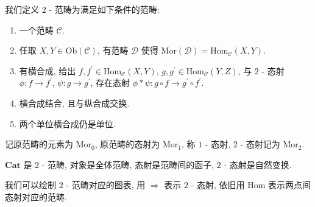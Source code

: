 \begin{definition}
    我们定义 \(2\) - 范畴为满足如下条件的范畴:

    \begin{enumerate}
        \item 一个范畴 \(\mathcal{C}\).
        \item 任取 \(X,Y \in \mathrm{Ob} (\mathcal{C})\), 有范畴 \(\mathcal{D}\) 使得 \(\mathrm{Mor} (\mathcal{D}) = \mathrm{Hom}_\mathcal{C} (X,Y)\).
        \item 有横合成, 给出 \(f, f^\prime \in \mathrm{Hom}_\mathcal{C} (X,Y)\), \(g, g^\prime \in \mathrm{Hom}_\mathcal{C} (Y,Z)\), 与
                \(2\) - 态射 \(\phi : f \to f^\prime\), \(\psi : g \to g^\prime\), 存在态射 \(\phi \ast \psi : g \circ f \to g^\prime \circ f^\prime\).
        \item 横合成结合, 且与纵合成交换.
        \item 两个单位横合成仍是单位.
    \end{enumerate}
\end{definition}

记原范畴的元素为 \(\mathrm{Mor}_0\), 原范畴的态射为 \(\mathrm{Mor}_1\), 称 \(1\) - 态射, \(2\) - 态射记为 \(\mathrm{Mor}_2\).

\begin{example}
    \(\mathbf{Cat}\) 是 \(2\) - 范畴, 对象是全体范畴, 态射是范畴间的函子, \(2\) - 态射是自然变换.
\end{example}

我们可以绘制 \(2\) - 范畴对应的图表, 用 \(\Rightarrow\) 表示 \(2\) - 态射, 依旧用 \(\mathrm{Hom}\) 表示两点间态射对应的范畴.

